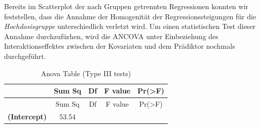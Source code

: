 \documentclass[]{article}
\begin{document}
Bereits im Scatterplot der nach Gruppen getrennten Regressionen konnten
wir feststellen, dass die Annahme der Homogenität der
Regressionssteigungen für die \emph{Hochdosisgruppe} unterschiedlich
verletzt wird. Um einen statistischen Test dieser Annahme durchzufürhen,
wird die ANCOVA unter Einbeziehung des Interaktionseffektes zwischen der
Kovariaten und dem Prädiktor nochmals durchgeführt.

\begin{longtable}[]{@{}ccccc@{}}
\caption{Anova Table (Type III tests)}\tabularnewline
\toprule
\begin{minipage}[b]{0.30\columnwidth}\centering\strut
~\strut
\end{minipage} & \begin{minipage}[b]{0.11\columnwidth}\centering\strut
Sum Sq\strut
\end{minipage} & \begin{minipage}[b]{0.06\columnwidth}\centering\strut
Df\strut
\end{minipage} & \begin{minipage}[b]{0.12\columnwidth}\centering\strut
F value\strut
\end{minipage} & \begin{minipage}[b]{0.13\columnwidth}\centering\strut
Pr(\textgreater{}F)\strut
\end{minipage}\tabularnewline
\midrule
\endfirsthead
\toprule
\begin{minipage}[b]{0.30\columnwidth}\centering\strut
~\strut
\end{minipage} & \begin{minipage}[b]{0.11\columnwidth}\centering\strut
Sum Sq\strut
\end{minipage} & \begin{minipage}[b]{0.06\columnwidth}\centering\strut
Df\strut
\end{minipage} & \begin{minipage}[b]{0.12\columnwidth}\centering\strut
F value\strut
\end{minipage} & \begin{minipage}[b]{0.13\columnwidth}\centering\strut
Pr(\textgreater{}F)\strut
\end{minipage}\tabularnewline
\midrule
\endhead
\begin{minipage}[t]{0.30\columnwidth}\centering\strut
\textbf{(Intercept)}\strut
\end{minipage} & \begin{minipage}[t]{0.11\columnwidth}\centering\strut
53.54\strut
\end{minipage} & \begin{minipage}[t]{0.06\columnwidth}\centering\strut

\end{minipage}
\end{longtable}
\end{document}
